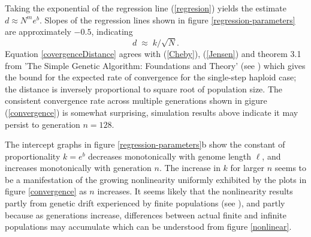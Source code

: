 Taking the exponential of the regression line (\ref{regresion}) yields
the estimate
$d \approx N^m e^b $.
Slopes of the regression lines shown in figure \ref{regression-parameters} are
approximately $-0.5$, indicating
\begin{equation}
\label{covergenceDistance}
d \; \approx \; k/\sqrt{N}.
\end{equation} 
Equation \ref{covergenceDistance} agrees with (\ref{Cheby}), (\ref{Jensen}) and 
theorem 3.1 from 'The Simple Genetic Algorithm: Foundations and Theory' (see \cite{Vose1999}) 
which gives the bound for the expected rate of convergence for the single-step haploid case; 
the distance is inversely proportional to square root of population size. 
The consistent convergence rate
across multiple generations shown in gigure (\ref{convergence}) is somewhat surprising, simulation
results above indicate it may persist to generation $n = 128$.

The intercept graphs in figure \ref{regression-parameters}b show the constant of proportionality $k =
e^b$ decreases monotonically with genome length $\ell$, and increases
monotonically with generation $n$.  The increase in $k$ for larger $n$
seems to be a manifestation of the growing nonlinearity uniformly
exhibited by the plots in figure \ref{convergence} as $n$ increases.  It seems
likely that the nonlinearity results partly from genetic drift experienced by
finite populations (see \cite{CrowKimura}), and partly because as generations increase, 
differences between actual finite and infinite populations may accumulate 
which can be understood from figure \ref{nonlinear}. 


